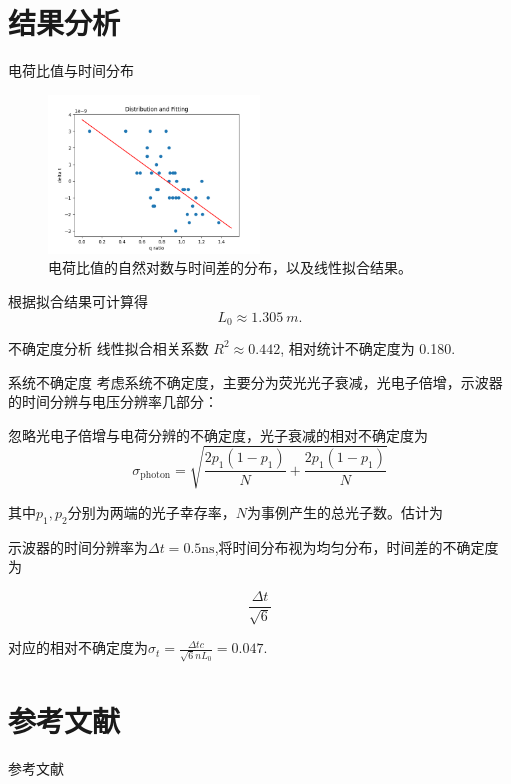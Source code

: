 \documentclass[10pt]{beamer}
\begin{document}
\section{结果分析}
\label{sec:orgc25006c}
\begin{frame}[label={sec:org93946de}]{电荷比值与时间分布}
\begin{figure}[htbp]
\centering
\includegraphics[width=0.5\textwidth]{../AttenuationLength/figs/dist.png}
\caption{电荷比值的自然对数与时间差的分布，以及线性拟合结果。}
\end{figure}

根据拟合结果可计算得
\begin{equation}
\label{eq:3}
L_0 \approx \qty{1.305}{m}.
\end{equation}
\end{frame}
\begin{frame}[label={sec:orgd4b6778}]{不确定度分析}
线性拟合相关系数 \(R^2 \approx 0.442\), 相对统计不确定度为 0.180.
\end{frame}
\begin{frame}{系统不确定度}
    考虑系统不确定度，主要分为荧光光子衰减，光电子倍增，示波器的时间分辨与电压分辨率几部分：

    忽略光电子倍增与电荷分辨的不确定度，光子衰减的相对不确定度为
    $$\sigma_\mathrm{photon}=\sqrt{\frac{2p_1(1-p_1)}{N}+\frac{2p_1(1-p_1)}{N}}$$

    其中$p_1,p_2$分别为两端的光子幸存率，$N$为事例产生的总光子数。估计为

    示波器的时间分辨率为$\Delta t=0.5\mathrm{ns}$,将时间分布视为均匀分布，时间差的不确定度为

    $$\frac{\Delta t}{\sqrt{6}}$$

    对应的相对不确定度为$\sigma_t=\frac{\Delta tc}{\sqrt{6}nL_0}=0.047.$

\end{frame}
\section{参考文献}
\label{sec:orgf6ca842}
\begin{frame}[allowframebreaks]{参考文献}
\end{frame}
\end{document}
